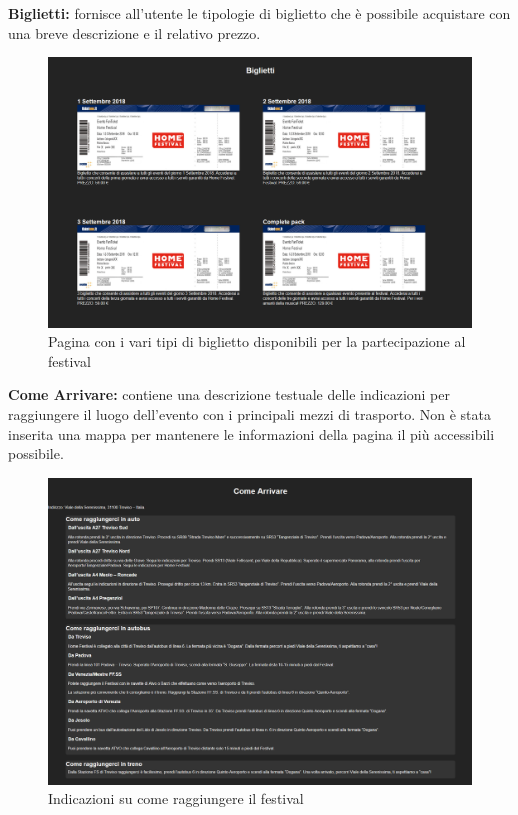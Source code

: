 \documentclass[10pt, a4paper]{article}
\begin{document}
\newpage 
\vspace*{100px}
\begin{flushleft}\textbf{Biglietti: }fornisce all'utente le tipologie di biglietto che è possibile acquistare con una breve descrizione e il relativo prezzo.\end{flushleft}
\begin{figure}[h!]
  \centering
  \includegraphics[width=1\textwidth]{Images/biglietti.png}
  \caption{Pagina con i vari tipi di biglietto disponibili per la partecipazione al festival}
  \label{fig:biglietti}
\end{figure}
\begin{flushleft} \textbf{Come Arrivare: }contiene una descrizione testuale delle indicazioni per raggiungere il luogo dell'evento con i principali mezzi di trasporto. Non è stata inserita una mappa per mantenere le informazioni della pagina il più accessibili possibile. \end{flushleft}
\begin{figure}[h!]
  \centering
 \includegraphics[width=1\textwidth]{Images/indicazioni.png}
  \caption{Indicazioni su come raggiungere il festival}
  \label{fig:indicazioni}
\end{figure}
\end{document}
